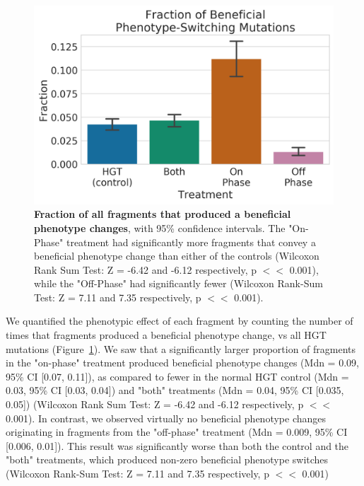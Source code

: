 \documentclass[letterpaper]{article}
\begin{document}
	\begin{figure}[h!]
	\begin{center}
	\includegraphics[width=0.75\columnwidth]{figures/beneficial_fraction_by_cycle_phase_source.png}
	\caption{\textbf{Fraction of all fragments that produced a beneficial phenotype changes}, with 95\% confidence intervals. The "On-Phase" treatment had significantly more fragments that convey a beneficial phenotype change than either of the controls (Wilcoxon Rank Sum Test: Z = -6.42 and -6.12 respectively, p $<<$ 0.001), while the "Off-Phase" had significantly fewer (Wilcoxon Rank-Sum Test: Z = 7.11 and 7.35 respectively, p $<<$ 0.001).
	}\label{fig:beneficial_fraction_by_cycle_phase_source}
	\end{center}
	\end{figure}

We quantified the phenotypic effect of each fragment by counting the number of times that fragments produced a beneficial phenotype change, vs all HGT mutations (Figure~\ref{fig:beneficial_fraction_by_cycle_phase_source}). We saw that a significantly larger proportion of fragments in the "on-phase" treatment produced beneficial phenotype changes (Mdn = 0.09, 95\% CI [0.07, 0.11]), as compared to fewer in the normal HGT control (Mdn = 0.03, 95\% CI [0.03, 0.04]) and "both" treatments (Mdn = 0.04, 95\% CI [0.035, 0.05]) (Wilcoxon Rank Sum Test: Z = -6.42 and -6.12 respectively, p $<<$ 0.001). In contrast, we observed virtually no beneficial phenotype changes originating in fragments from the "off-phase" treatment (Mdn = 0.009, 95\% CI [0.006, 0.01]). This result was significantly worse than both the control and the "both" treatments, which produced non-zero beneficial phenotype switches (Wilcoxon Rank-Sum Test: Z = 7.11 and 7.35 respectively, p $<<$ 0.001) 
\end{document}
